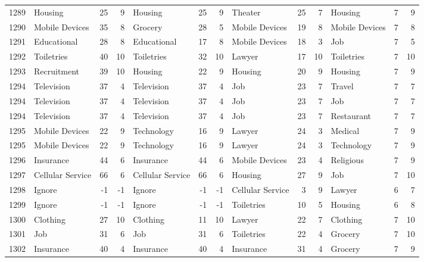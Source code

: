 \begin{figure}[htbp]
\begin{tabular}{rlrrlrrlrrlrr}
    1289  & Housing & 25    & 9     & Housing & 25    & 9     & Theater & 25    & 7     & Housing & 7     & 9 \\
    1290  & Mobile Devices & 35    & 8     & Grocery & 28    & 5     & Mobile Devices & 19    & 8     & Mobile Devices & 7     & 8 \\
    1291  & Educational & 28    & 8     & Educational & 17    & 8     & Mobile Devices & 18    & 3     & Job   & 7     & 5 \\
    1292  & Toiletries & 40    & 10    & Toiletries & 32    & 10    & Lawyer & 17    & 10    & Toiletries & 7     & 10 \\
    1293  & Recruitment & 39    & 10    & Housing & 22    & 9     & Housing & 20    & 9     & Housing & 7     & 9 \\
    1294  & Television & 37    & 4     & Television & 37    & 4     & Job   & 23    & 7     & Travel & 7     & 7 \\
    1294  & Television & 37    & 4     & Television & 37    & 4     & Job   & 23    & 7     & Job   & 7     & 7 \\
    1294  & Television & 37    & 4     & Television & 37    & 4     & Job   & 23    & 7     & Restaurant & 7     & 7 \\
    1295  & Mobile Devices & 22    & 9     & Technology & 16    & 9     & Lawyer & 24    & 3     & Medical & 7     & 9 \\
    1295  & Mobile Devices & 22    & 9     & Technology & 16    & 9     & Lawyer & 24    & 3     & Technology & 7     & 9 \\
    1296  & Insurance & 44    & 6     & Insurance & 44    & 6     & Mobile Devices & 23    & 4     & Religious & 7     & 9 \\
    1297  & Cellular Service & 66    & 6     & Cellular Service & 66    & 6     & Housing & 27    & 9     & Job   & 7     & 10 \\
    1298  & Ignore & -1    & -1    & Ignore & -1    & -1    & Cellular Service & 3     & 9     & Lawyer & 6     & 7 \\
    1299  & Ignore & -1    & -1    & Ignore & -1    & -1    & Toiletries & 10    & 5     & Housing & 6     & 8 \\
    1300  & Clothing & 27    & 10    & Clothing & 11    & 10    & Lawyer & 22    & 7     & Clothing & 7     & 10 \\
    1301  & Job   & 31    & 6     & Job   & 31    & 6     & Toiletries & 22    & 4     & Grocery & 7     & 10 \\
    1302  & Insurance & 40    & 4     & Insurance & 40    & 4     & Insurance & 31    & 4     & Grocery & 7     & 9 \\

\end{tabular}
\end{figure}
